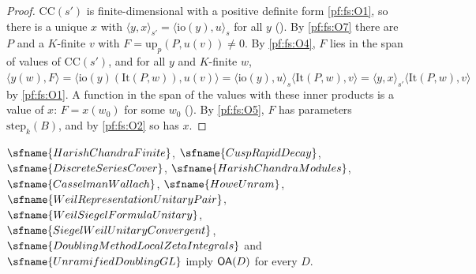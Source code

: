 \begin{proof}
$\mathrm{CC}(s')$ is finite-dimensional with a positive definite form \ref{pf:fs:O1}, so there is a unique $x$ with
$\langle y,x\rangle_{s'}=\langle\mathrm{io}(y),u\rangle_s$ for all $y$ (). By
\ref{pf:fs:O7} there are $P$ and a $K$-finite $v$ with $F=\mathrm{up}_p(P,u(v))\ne0$. By \ref{pf:fs:O4}, $F$ lies in the span of
values of $\mathrm{CC}(s')$, and for all $y$ and $K$-finite $w$,
$\langle y(w),F\rangle=\langle\mathrm{io}(y)(\mathrm{It}(P,w)),u(v)\rangle=\langle\mathrm{io}(y),u\rangle_s\langle\mathrm{It}(P,w),v\rangle
=\langle y,x\rangle_{s'}\langle\mathrm{It}(P,w),v\rangle$ by \ref{pf:fs:O1}. A function in the span of the values with these inner
products is a value of $x$: $F=x(w_0)$ for some $w_0$ (). By
\ref{pf:fs:O5}, $F$ has parameters $\mathrm{step}_k(B)$, and by \ref{pf:fs:O2} so has $x$.
\end{proof}

\begin{proposition}\label{pf:fs:ontoAll}\sloppy
$\sfname{HarishChandraFinite}$, $\sfname{CuspRapidDecay}$, $\sfname{DiscreteSeriesCover}$, $\sfname{HarishChandraModules}$,
$\sfname{CasselmanWallach}$, $\sfname{HoweUnram}$, $\sfname{WeilRepresentationUnitaryPair}$, $\sfname{WeilSiegelFormulaUnitary}$,
$\sfname{SiegelWeilUnitaryConvergent}$, $\sfname{DoublingMethodLocalZetaIntegrals}$ and $\sfname{UnramifiedDoublingGL}$ imply
$\mathsf{OA}(D)$ for every $D$.
\end{proposition}

